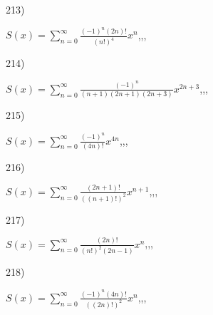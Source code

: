 \documentclass[11pt, ukrainian]{article}
\begin{document}
\par
\vspace{0.9cm}
213) \space 
{%
{$S(x)=\sum\limits_{n=0}^{\infty}{\frac{{(-1)^n}(2n)!}{(n!)^4}}{x^{{n}}}$},,, \par \smallskip  
}
\par
\vspace{0.9cm}
214) \space 
{%
{$S(x)=\sum\limits_{n=0}^{\infty}{\frac{(-1)^n}{(n+1)(2n+1)(2n+3)}}{x^{{2n+3}}}$},,, \par \smallskip  
}
\par
\vspace{0.9cm}
215) \space 
{%
{$S(x)=\sum\limits_{n=0}^{\infty}{\frac{(-1)^n}{(4n)!}}{x^{{4n}}}$},,, \par \smallskip  
}
\par
\vspace{0.9cm}
216) \space 
{%
{$S(x)=\sum\limits_{n=0}^{\infty}{\frac{(2n+1)!}{((n+1)!)^2}}{x^{{n+1}}}$},,, \par \smallskip  
}
\par
\vspace{0.9cm}
217) \space 
{%
{$S(x)=\sum\limits_{n=0}^{\infty}{\frac{(2n)!}{(n!)^2(2n-1)}}{x^{n}}$},,, \par \smallskip  
}
\par
\vspace{0.9cm}
218) \space 
{%
{$S(x)=\sum\limits_{n=0}^{\infty}{\frac{{(-1)^n}(4n)!}{{((2n)!)^2}}}{x^{{n}}}$},,, \par \smallskip  
}
\end{document}
